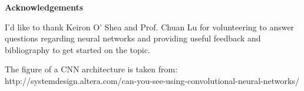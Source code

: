 \thispagestyle{empty}

\begin{center}
    {\LARGE\bf Acknowledgements}
\end{center}

I'd like to thank Keiron O' Shea and Prof. Chuan Lu for volunteering to answer questions regarding neural networks and providing useful feedback and bibliography to get started on the topic.

The figure of a CNN architecture is taken from:
http://systemdesign.altera.com/can-you-see-using-convolutional-neural-networks/